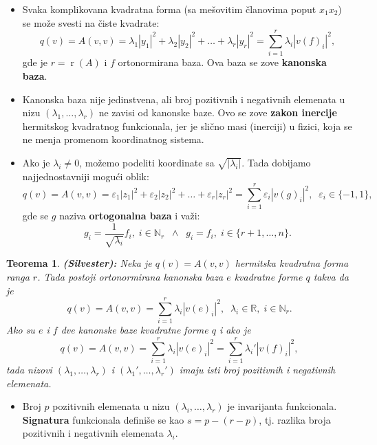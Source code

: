 \documentclass[a4paper,12pt,twoside]{report}
\newtheorem{theorem}{Teorema}[section]
\numberwithin{algorithm}{section}
\begin{document}
\begin{itemize}
    \item Svaka komplikovana kvadratna forma (sa mešovitim članovima poput $x_1x_2$) se može svesti na čiste kvadrate:
    \[ q(v) = A(v, v) = \lambda_1|y_1|^2 + \lambda_2|y_2|^2 + \dots + \lambda_r|y_r|^2 = \sum_{i=1}^{r} \lambda_i |v(f)_i|^2,\]
    gde je $r = \operatorname{r}(A)$ i $f$ ortonormirana baza. Ova baza se zove \textbf{kanonska baza}.
    \item Kanonska baza nije jedinstvena, ali broj pozitivnih i negativnih elemenata u nizu $(\lambda_1, \dots, \lambda_r)$ ne 
    zavisi od kanonske baze. Ovo se zove \textbf{zakon inercije} hermitskog kvadratnog funkcionala, jer je slično masi (inerciji) u fizici, 
    koja se ne menja promenom koordinatnog sistema.
    \item Ako je $\lambda_i \neq 0$, možemo podeliti koordinate sa $\sqrt{|\lambda_i|}$. Tada dobijamo najjednostavniji mogući 
    oblik: \[ q(v) = A(v, v) = \varepsilon_1|z_1|^2 + \varepsilon_2|z_2|^2 + \dots + \varepsilon_r|z_r|^2 = \sum_{i=1}^{r} \varepsilon_i |v(g)_i|^2, \;\; \varepsilon_i \in \{-1, 1\}, \]
    gde se $g$ naziva \textbf{ortogonalna baza} i važi:
    \[ g_i = \frac{1}{\sqrt{\lambda_i}}f_i, \; i \in \mathbb{N}_r \;\; \land \;\; g_i = f_i, \; i \in \{r+1, \dots, n\}.\]
\end{itemize}

\begin{theorem}
    \textbf{(Silvester):} Neka je $q(v) = A(v, v)$ hermitska kvadratna forma ranga $r$. Tada postoji ortonormirana kanonska baza $e$
    kvadratne forme $q$ takva da je
    \[ q(v) = A(v, v) = \sum_{i=1}^{r} \lambda_i |v(e)_i|^2, \;\; \lambda_i \in \mathbb{R}, \; i \in \mathbb{N}_r. \]
    Ako su $e$ i $f$ dve kanonske baze kvadratne forme $q$ i ako je 
    \[ q(v) = A(v, v) = \sum_{i=1}^{r} \lambda_i |v(e)_i|^2 = \sum_{i=1}^{r} \lambda_i' |v(f)_i|^2, \]
    tada nizovi $(\lambda_1, \dots, \lambda_r)$ i $(\lambda_1', \dots, \lambda_r')$ imaju isti broj pozitivnih i negativnih elemenata.
\end{theorem}

\begin{itemize}
    \item Broj $p$ pozitivnih elemenata u nizu $(\lambda_i, \dots, \lambda_r)$ je invarijanta funkcionala. \textbf{Signatura} funkcionala 
    definiše se kao $s = p - (r - p)$, tj. razlika broja pozitivnih i negativnih elemenata $\lambda_i$.
\end{itemize}
\end{document}
